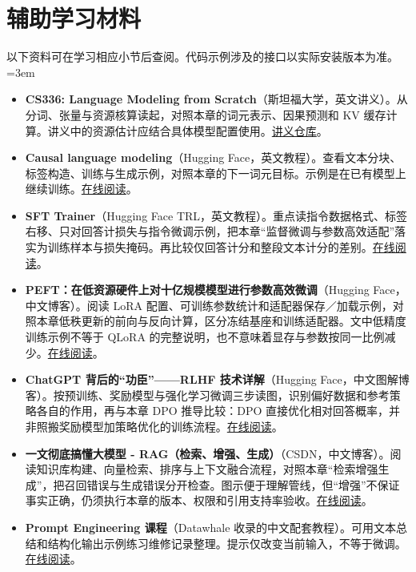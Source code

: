 \section*{辅助学习材料}
以下资料可在学习相应小节后查阅。代码示例涉及的接口以实际安装版本为准。
\begingroup
\emergencystretch=3em
\begin{itemize}
\item \textbf{CS336: Language Modeling from Scratch}（斯坦福大学，英文讲义）。从分词、张量与资源核算读起，对照本章的词元表示、因果预测和 KV 缓存计算。讲义中的资源估计应结合具体模型配置使用。\href{https://github.com/stanford-cs336/lectures}{讲义仓库}。
\item \textbf{Causal language modeling}（Hugging Face，英文教程）。查看文本分块、标签构造、训练与生成示例，对照本章的下一词元目标。示例是在已有模型上继续训练。\href{https://huggingface.co/docs/transformers/tasks/language\_modeling}{在线阅读}。
\item \textbf{SFT Trainer}（Hugging Face TRL，英文教程）。重点读指令数据格式、标签右移、只对回答计损失与指令微调示例，把本章“监督微调与参数高效适配”落实为训练样本与损失掩码。再比较仅回答计分和整段文本计分的差别。\href{https://huggingface.co/docs/trl/sft\_trainer}{在线阅读}。
\item \textbf{PEFT：在低资源硬件上对十亿规模模型进行参数高效微调}（Hugging Face，中文博客）。阅读 LoRA 配置、可训练参数统计和适配器保存／加载示例，对照本章低秩更新的前向与反向计算，区分冻结基座和训练适配器。文中低精度训练示例不等于 QLoRA 的完整说明，也不意味着显存与参数按同一比例减少。\href{https://huggingface.co/blog/zh/peft}{在线阅读}。
\item \textbf{ChatGPT 背后的“功臣”——RLHF 技术详解}（Hugging Face，中文图解博客）。按预训练、奖励模型与强化学习微调三步读图，识别偏好数据和参考策略各自的作用，再与本章 DPO 推导比较：DPO 直接优化相对回答概率，并非照搬奖励模型加策略优化的训练流程。\href{https://huggingface.co/blog/zh/rlhf}{在线阅读}。
\item \textbf{一文彻底搞懂大模型 - RAG（检索、增强、生成）}（CSDN，中文博客）。阅读知识库构建、向量检索、排序与上下文融合流程，对照本章“检索增强生成”，把召回错误与生成错误分开检查。图示便于理解管线，但“增强”不保证事实正确，仍须执行本章的版本、权限和引用支持率验收。\href{https://blog.csdn.net/a2875254060/article/details/142468037}{在线阅读}。
\item \textbf{Prompt Engineering 课程}（Datawhale 收录的中文配套教程）。可用文本总结和结构化输出示例练习维修记录整理。提示仅改变当前输入，不等于微调。\href{https://github.com/datawhalechina/llm-cookbook}{在线阅读}。
\end{itemize}
\endgroup
